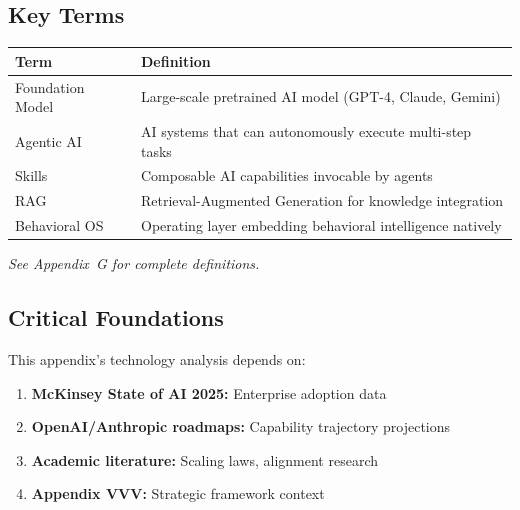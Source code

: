 
\subsection{Key Terms}

\begin{tabular}{@{}p{3cm}p{9cm}@{}}
\textbf{Term} & \textbf{Definition} \\
\hline
Foundation Model & Large-scale pretrained AI model (GPT-4, Claude, Gemini) \\
Agentic AI & AI systems that can autonomously execute multi-step tasks \\
Skills & Composable AI capabilities invocable by agents \\
RAG & Retrieval-Augmented Generation for knowledge integration \\
Behavioral OS & Operating layer embedding behavioral intelligence natively \\
\end{tabular}

\noindent\textit{See Appendix~G for complete definitions.}


\subsection{Critical Foundations}

\begin{tcolorbox}[colback=red!5!white, colframe=red!75!black,
    title=\textbf{Critical Foundations for Appendix VVV.0}]

This appendix's technology analysis depends on:

\begin{enumerate}
    \item \textbf{McKinsey State of AI 2025:} Enterprise adoption data
    \item \textbf{OpenAI/Anthropic roadmaps:} Capability trajectory projections
    \item \textbf{Academic literature:} Scaling laws, alignment research
    \item \textbf{Appendix VVV:} Strategic framework context
\end{enumerate}

\end{tcolorbox}

